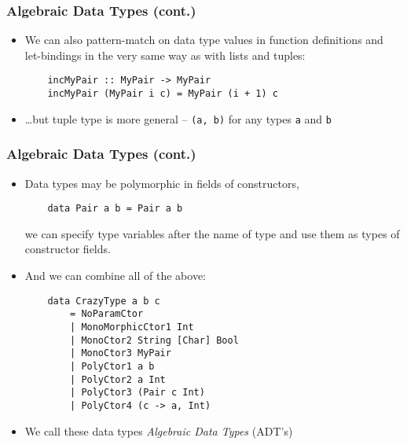 \documentclass[final,handout]{beamer}
\begin{document}
\begin{frame}[fragile]
    \frametitle{Algebraic Data Types (cont.)}

    \begin{itemize}
        \item We can also pattern-match on data type values in function definitions and let-bindings
            in the very same way as with lists and tuples:

            \begin{lstlisting}
    incMyPair :: MyPair -> MyPair
    incMyPair (MyPair i c) = MyPair (i + 1) c
            \end{lstlisting}

        \item<2-> \dots but tuple type is more general -- \texttt{(a, b)} for any
            types \texttt{a} and \texttt{b}
    \end{itemize}
\end{frame}

\begin{frame}[fragile]
    \frametitle{Algebraic Data Types (cont.)}

    \begin{itemize}
        \item Data types may be polymorphic in fields of constructors,
            
            \begin{lstlisting}
    data Pair a b = Pair a b
            \end{lstlisting}

            we can specify type variables after the name of type and use them as
            types of constructor fields.

        \item<2-> And we can combine all of the above:
            \begin{lstlisting}
    data CrazyType a b c
        = NoParamCtor
        | MonoMorphicCtor1 Int 
        | MonoCtor2 String [Char] Bool
        | MonoCtor3 MyPair
        | PolyCtor1 a b
        | PolyCtor2 a Int
        | PolyCtor3 (Pair c Int)
        | PolyCtor4 (c -> a, Int)
            \end{lstlisting}

        \item We call these data types \emph{Algebraic Data Types} (ADT's)
    \end{itemize}
\end{frame}
\end{document}
